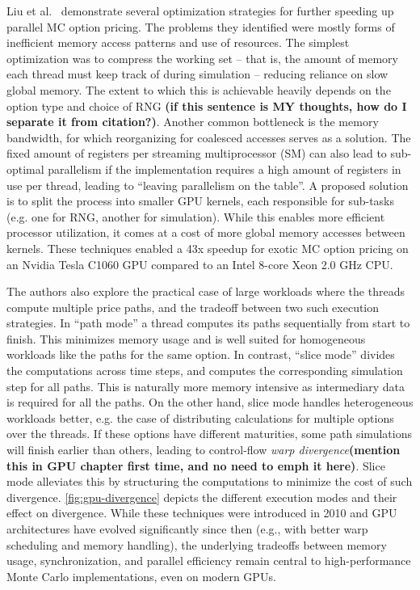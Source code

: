 \documentclass[english,12pt,a4paper,pdftex,sci,utf8]{aaltothesis}
\begin{document}
Liu et al.\ \cite{liu2010efficient} demonstrate several optimization strategies for further speeding up parallel MC option pricing. The problems they identified were mostly forms of inefficient memory access patterns and use of resources. The simplest optimization was to compress the working set -- that is, the amount of memory each thread must keep track of during simulation -- reducing reliance on slow global memory. The extent to which this is achievable heavily depends on the option type and choice of RNG \textbf{(if this sentence is MY thoughts, how do I separate it from citation?)}. Another common bottleneck is the memory bandwidth, for which reorganizing for coalesced accesses serves as a solution. The fixed amount of registers per streaming multiprocessor (SM) can also lead to sub-optimal parallelism if the implementation requires a high amount of registers in use per thread, leading to ``leaving parallelism on the table''. A proposed solution is to split the process into smaller GPU kernels, each responsible for sub-tasks (e.g. one for RNG, another for simulation). While this enables more efficient processor utilization, it comes at a cost of more global memory accesses between kernels. These techniques enabled a 43x speedup for exotic MC option pricing on an Nvidia Tesla C1060 GPU compared to an Intel 8-core Xeon 2.0 GHz CPU.

The authors also explore the practical case of large workloads where the threads compute multiple price paths, and the tradeoff between two such execution strategies. In ``path mode'' a thread computes its paths sequentially from start to finish. This minimizes memory usage and is well suited for homogeneous workloads like the paths for the same option. In contrast, ``slice mode'' divides the computations across time steps, and computes the corresponding simulation step for all paths. This is naturally more memory intensive as intermediary data is required for all the paths. On the other hand, slice mode handles heterogeneous workloads better, e.g. the case of distributing calculations for multiple options over the threads. If these options have different maturities, some path simulations will finish earlier than others, leading to control-flow \emph{warp divergence}\textbf{(mention this in GPU chapter first time, and no need to emph it here)}. Slice mode alleviates this by structuring the computations to minimize the cost of such divergence. \cref{fig:gpu-divergence} depicts the different execution modes and their effect on divergence. While these techniques were introduced in 2010 and GPU architectures have evolved significantly since then (e.g., with better warp scheduling and memory handling), the underlying tradeoffs between memory usage, synchronization, and parallel efficiency remain central to high-performance Monte Carlo implementations, even on modern GPUs. \cite{liu2010efficient}
\end{document}
